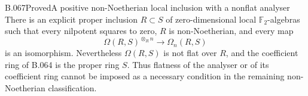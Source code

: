 \begin{saresult}{B.067}{Proved}{A positive non-Noetherian local inclusion with a nonflat analyser}
There is an explicit proper inclusion $R\subset S$
of zero-dimensional local $\mathbb F_2$-algebras
such that every nilpotent squares to zero,
$R$ is non-Noetherian, and every map
\[
 \Omega(R,S)^{\otimes_R n}\longrightarrow\Omega_n(R,S)
\]
is an isomorphism. Nevertheless $\Omega(R,S)$
is not flat over $R$, and the coefficient ring
of B.064 is the proper ring $S$.
Thus flatness of the analyser or of its coefficient
ring cannot be imposed as a necessary condition
in the remaining non-Noetherian classification.
\end{saresult}

